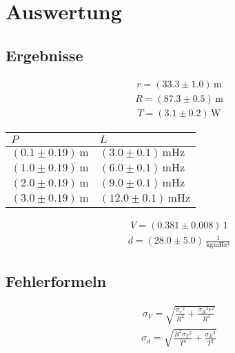 \documentclass[a4paper,10pt]{scrbook}
\begin{document}
\section*{Auswertung}

\subsection*{Ergebnisse}

\begin{align*}
r = (33.3\pm 1.0)\,\mathrm{m}
\end{align*}
\begin{align*}
R = (87.3\pm 0.5)\,\mathrm{m}
\end{align*}
\begin{align*}
T = (3.1\pm 0.2)\,\mathrm{W}
\end{align*}
\begin{table}[htb]
\centering
\begin{tabular}{|l|l|}
\hline
$P$ & $L$  \\ \hline
$(0.1\pm 0.19)\,\mathrm{m}$ & $(3.0\pm 0.1)\,\mathrm{m Hz}$\\ \hline
$(1.0\pm 0.19)\,\mathrm{m}$ & $(6.0\pm 0.1)\,\mathrm{m Hz}$\\ \hline
$(2.0\pm 0.19)\,\mathrm{m}$ & $(9.0\pm 0.1)\,\mathrm{m Hz}$\\ \hline
$(3.0\pm 0.19)\,\mathrm{m}$ & $(12.0\pm 0.1)\,\mathrm{m Hz}$\\ \hline
\end{tabular}
\end{table}
\begin{align*}
V = (0.381\pm 0.008)\,\mathrm{1}
\end{align*}
\begin{align*}
d = (28.0\pm 5.0)\,\mathrm{\frac{1}{kg m Hz^{3}}}
\end{align*}


\subsection*{Fehlerformeln}

\begin{align*}\sigma_{V}=\sqrt{\frac{{\sigma_{{r}}}^{2}}{{R}^{2}} + \frac{{\sigma_{{R}}}^{2} {r}^{2}}{{R}^{4}}}\end{align*}\begin{align*}\sigma_{d}=\sqrt{\frac{{R}^{2} {\sigma_{{T}}}^{2}}{{T}^{4}} + \frac{{\sigma_{{R}}}^{2}}{{T}^{2}}}\end{align*}
\end{document}
